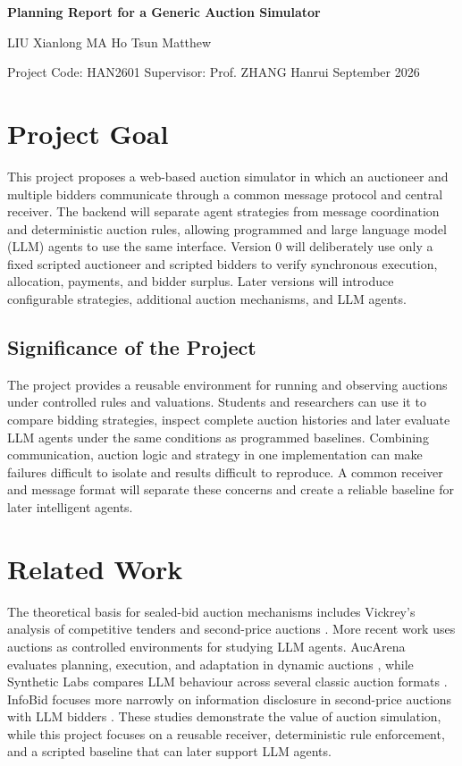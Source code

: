 \documentclass[11pt,a4paper]{article}
\begin{document}
\begin{center}
  {\fontsize{14}{16}\selectfont\bfseries
  Planning Report for a Generic Auction Simulator\par}
  \vspace{2pt}
  {\normalsize LIU Xianlong \quad MA Ho Tsun Matthew\par}
  \vspace{1pt}
  {\small Project Code: HAN2601 \quad
  Supervisor: Prof. ZHANG Hanrui  September 2026\par}
\end{center}
\vspace{-0.6em}

\section{Project Goal}
This project proposes a web-based auction simulator in which an auctioneer and multiple bidders communicate through a common message protocol and central receiver. The backend will separate agent strategies from message coordination and deterministic auction rules, allowing programmed and large language model (LLM) agents to use the same interface. Version 0 will deliberately use only a fixed scripted auctioneer and scripted bidders to verify synchronous execution, allocation, payments, and bidder surplus. Later versions will introduce configurable strategies, additional auction mechanisms, and LLM agents.

\subsection{Significance of the Project}
The project provides a reusable environment for running and observing auctions under controlled rules and valuations. Students and researchers can use it to compare bidding strategies, inspect complete auction histories and later evaluate LLM agents under the same conditions as programmed baselines. Combining communication, auction logic and strategy in one implementation can make failures difficult to isolate and results difficult to reproduce. A common receiver and message format will separate these concerns and create a reliable baseline for later intelligent agents.

\section{Related Work}
The theoretical basis for sealed-bid auction mechanisms includes Vickrey's analysis of competitive tenders and second-price auctions \citep{vickrey1961counterspeculation}. More recent work uses auctions as controlled environments for studying LLM agents. AucArena evaluates planning, execution, and adaptation in dynamic auctions \citep{chen2024auction}, while Synthetic Labs compares LLM behaviour across several classic auction formats \citep{shah2025syntheticlabs}. InfoBid focuses more narrowly on information disclosure in second-price auctions with LLM bidders \citep{yin2025infobid}. These studies demonstrate the value of auction simulation, while this project focuses on a reusable receiver, deterministic rule enforcement, and a scripted baseline that can later support LLM agents.
\end{document}
